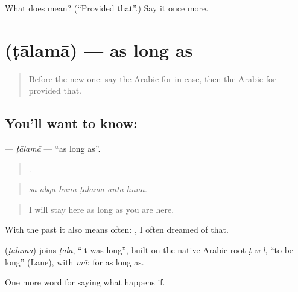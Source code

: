 \begin{tcolorbox}[breakable,colback=teal!4,colframe=teal!35!black,title={Before you move on}]
What does   mean? (\textquotedblleft{}Provided that\textquotedblright{}.) Say it once more.
\end{tcolorbox}
\section[\texorpdfstring{\ar{طالما} (ṭālamā)}{طالما (ṭālamā)}]{ (ṭālamā) — as long as}

\label{lesson:AR-C399-talama}



\begin{quote}
Before the new one: say the Arabic for in case, then the Arabic for provided that.
\end{quote}

\subsection*{You'll want to know: }
\textbf{} — \emph{ṭālamā} — \textquotedblleft{}as long as\textquotedblright{}.

\begin{quote}
    .
\end{quote}

\begin{quote}
\emph{sa-abqā hunā ṭālamā anta hunā.}
\end{quote}

\begin{quote}
I will stay here as long as you are here.
\end{quote}

With the past it also means often:   , I often dreamed of that.

\begin{cousinweb}
\textbf{} (\emph{ṭālamā}) joins \emph{ṭāla}, \textquotedblleft{}it was long\textquotedblright{}, built on the native Arabic root \emph{ṭ-w-l}, \textquotedblleft{}to be long\textquotedblright{} (Lane), with \emph{mā}: for as long as.
\end{cousinweb}

\begin{grammarlens}[title={What you've built}]
One more word for saying what happens if.
\end{grammarlens}

